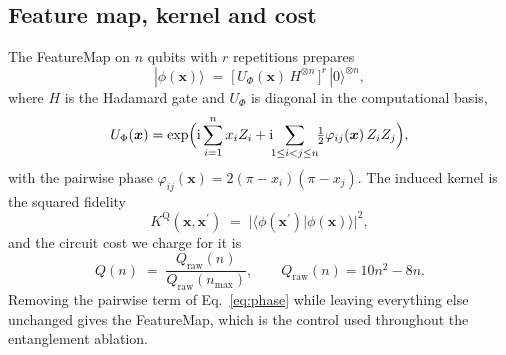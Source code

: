 %

\subsection{Feature map, kernel and cost}
\begin{revbody}

The \ZZ{}FeatureMap on $n$ qubits with $r$ repetitions prepares
\begin{equation}
\label{eq:featuremap}
  |\phi(\bm{x})\rangle \;=\;
  \bigl[\,U_{\Phi}(\bm{x})\,H^{\otimes n}\,\bigr]^{r}\,|0\rangle^{\otimes n},
\end{equation}
where $H$ is the Hadamard gate and $U_{\Phi}$ is diagonal in the computational
basis,
\begin{equation}
\label{eq:phase}
  U_{\Phi}(\bm{x}) = \exp\Bigl(
    \mathrm{i}\sum_{i=1}^{n} x_i Z_i
    + \mathrm{i}\!\!\sum_{1\le i<j\le n}\!\!
      \tfrac{1}{2}\varphi_{ij}(\bm{x})\,Z_iZ_j
  \Bigr),
\end{equation}
with the pairwise phase $\varphi_{ij}(\bm{x}) = 2(\pi-x_i)(\pi-x_j)$.
The induced kernel is the squared fidelity
\begin{equation}
\label{eq:kernel}
  K^{\mathrm{Q}}(\bm{x},\bm{x}^{\prime}) \;=\;
  \bigl|\langle\phi(\bm{x}^{\prime})|\phi(\bm{x})\rangle\bigr|^{2},
\end{equation}
and the circuit cost we charge for it is
\begin{equation}
\label{eq:cost}
  Q(n) \;=\; \frac{Q_{\mathrm{raw}}(n)}{Q_{\mathrm{raw}}(n_{\max})},
  \qquad Q_{\mathrm{raw}}(n) = 10n^{2}-8n .
\end{equation}
Removing the pairwise term of Eq.~\eqref{eq:phase} while leaving everything else
unchanged gives the \Zmap{}FeatureMap, which is the control used throughout the
entanglement ablation.
\end{revbody}

